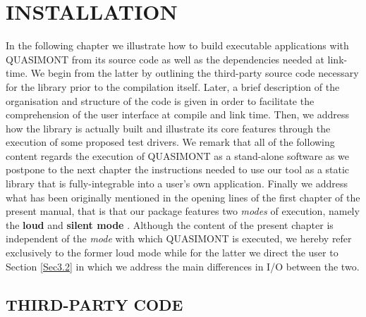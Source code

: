 \documentclass[a4paper, twosided]{book}
\begin{document}
\chapter[Installation]{\Huge \ttfamily INSTALLATION}

In the following chapter we illustrate how to build executable applications with QUASIMONT from its source code as well as the dependencies needed at link-time. We begin from the latter by outlining the third-party source code necessary for the library prior to the compilation itself. Later, a brief description of the organisation and structure of the code is given in order to facilitate the comprehension of the user interface at compile and link time. Then, we address how the library is actually built and illustrate its core features through the execution of some proposed test drivers. We remark that all of the following content regards the execution of QUASIMONT as a stand-alone software as we postpone to the next chapter the instructions needed to use our tool as a static library that is fully-integrable into a user's own application. Finally we address what has been originally mentioned in the opening lines of the first chapter of the present manual, that is that our package features two {\itshape modes} of execution, namely the \color{poliDarkBlue} \textbf{loud} \color{black} and \color{poliDarkBlue} \textbf{silent mode} \color{black}. Although the content of the present chapter is independent of the {\itshape mode} with which QUASIMONT is executed, we hereby refer exclusively to the former loud mode while for the latter we direct the user to Section \ref{Sec3.2} in which we address the main differences in I/O between the two.

\section[Third-party code]{\changefont THIRD-PARTY CODE}\label{Sec2.1}
\end{document}
